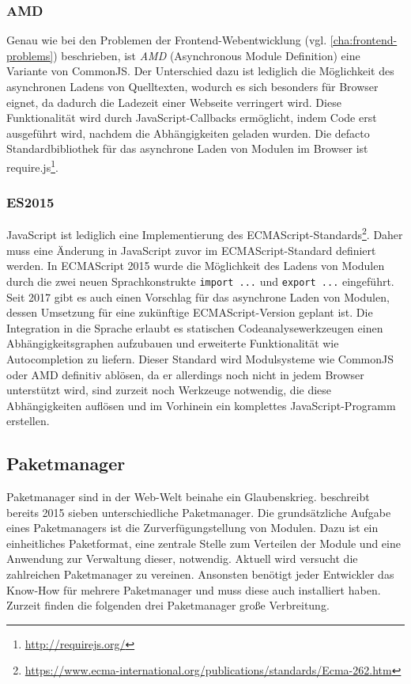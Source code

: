 \subsubsection{AMD}
\label{sub:amd}
Genau wie bei den Problemen der Frontend-Webentwicklung (vgl. \cref{cha:frontend-problems}) beschrieben, ist \emph{AMD} (Asynchronous Module Definition) eine Variante von CommonJS.
Der Unterschied dazu ist lediglich die Möglichkeit des asynchronen Ladens von Quelltexten, wodurch es sich besonders für Browser eignet, da dadurch die Ladezeit einer Webseite verringert wird.
Diese Funktionalität wird durch JavaScript-Callbacks ermöglicht, indem Code erst ausgeführt wird, nachdem die Abhängigkeiten geladen wurden.
Die defacto Standardbibliothek für das asynchrone Laden von Modulen im Browser ist require.js\footnote{\url{http://requirejs.org/}}.

\subsubsection{ES2015}
\label{sub:es2015}
JavaScript ist lediglich eine Implementierung des ECMAScript-Standards\footnote{\url{https://www.ecma-international.org/publications/standards/Ecma-262.htm}}.
Daher muss eine Änderung in JavaScript zuvor im ECMAScript-Standard definiert werden.
In ECMAScript 2015 wurde die Möglichkeit des Ladens von Modulen durch die zwei neuen Sprachkonstrukte \verb|import ...| und \verb|export ...| eingeführt.
Seit 2017 gibt es auch einen Vorschlag für das asynchrone Laden von Modulen, dessen Umsetzung für eine zukünftige ECMAScript-Version geplant ist.
Die Integration in die Sprache erlaubt es statischen Codeanalysewerkzeugen einen Abhängigkeitsgraphen aufzubauen und erweiterte Funktionalität wie Autocompletion zu liefern.
Dieser Standard wird Modulsysteme wie CommonJS oder AMD definitiv ablösen, da er allerdings noch nicht in jedem Browser unterstützt wird, sind zurzeit noch Werkzeuge notwendig, die diese Abhängigkeiten auflösen und im Vorhinein ein komplettes JavaScript-Programm erstellen.


\subsection{Paketmanager}
\label{sub:package-managers}
Paketmanager sind in der Web-Welt beinahe ein Glaubenskrieg.
\autocite{Farmer.package-managers:online} beschreibt bereits 2015 sieben unterschiedliche Paketmanager.
Die grundsätzliche Aufgabe eines Paketmanagers ist die Zurverfügungstellung von Modulen.
Dazu ist ein einheitliches Paketformat, eine zentrale Stelle zum Verteilen der Module und eine Anwendung zur Verwaltung dieser, notwendig.
Aktuell wird versucht die zahlreichen Paketmanager zu vereinen.
Ansonsten benötigt jeder Entwickler das Know-How für mehrere Paketmanager und muss diese auch installiert haben.
Zurzeit finden die folgenden drei Paketmanager große Verbreitung.


